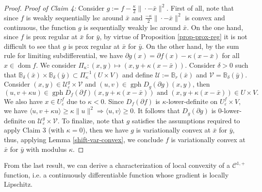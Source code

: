 \documentclass[smallextended,envcountsect,envcountsame]{svjour3}
\newcommand{\gph}{\operatorname{gph}}
\newcommand{\dom}{\operatorname{dom}}
\renewcommand{\epsilon}{\varepsilon}
\newcommand{\1}{\mathds{1}}
\begin{document}
\begin{proof}
		\emph{Proof of Claim 4:} Consider $g := f-\frac{\kappa}{2}\|\cdot - \bar x\|^2$. First of all, note that since $f$ is weakly sequentially lsc around $\bar x$ and $\frac{-\kappa}{2}\|\cdot-\bar x\|^2$ is convex and continuous, the function $g$ is sequentially weakly lsc around $\bar x$. On the one hand, since $f$ is prox regular at $\bar x$ for $\bar y$, by virtue of Proposition \ref{prop-prox-reg} it is not difficult to see that $g$ is prox regular at $\bar x$ for $\bar y$. On the other hand, by the sum rule for limiting subdifferential, we have $\partial g(x) = \partial f(x) -\kappa(x-\bar x)$ for all $x\in \dom f$. We consider $\Pi_\kappa\colon (x,y)\mapsto (x,y+\kappa(x-\bar x))$. Consider $\delta>0$ such that $\mathbb{B}_\delta(\bar x)\times \mathbb{B}_\delta(\bar y)\subset \Pi_\kappa^{-1}(U\times V)$ and define $\mathscr{U} := \mathbb{B}_r(\bar x)$ and $\mathscr{V} = \mathbb{B}_\delta(\bar y)$. Consider $(x,y)\in \mathscr{U}_{\epsilon}^g\times \mathscr{V}$ and $(u,v)\in \gph D_g(\partial g)(x,y)$, then $$(u,v+\kappa u)\in \gph D_f(\partial f)(x,y+\kappa(x-\bar x))\text{ and }(x,y+\kappa(x-\bar x))\in U\times V.$$ We also have $x\in U_\epsilon^f$ due to $\kappa<0$. Since $D_f(\partial f)$ is $\kappa$-lower-definite on $U_\epsilon^f\times V$, we have $\langle u,v+\kappa u\rangle\geq \kappa\|u\|^2\Rightarrow\langle u,v\rangle\geq 0$. It follows that $D_g(\partial g)$ is $0$-lower-definite on $\mathscr{U}_{\epsilon}^g\times \mathscr{V}$. To finalize, note that $g$ satisfies the assumptions required to apply Claim 3 (with $\kappa=0$), then we have $g$ is variationally convex at $\bar x$ for $\bar y$, thus, applying Lemma \ref{shift-var-convex}, we conclude $f$ is variationally convex at $\bar x$ for $\bar y$ with modulus $\kappa$. 
	\end{proof}
	
	From the last result, we can derive a characterization of local convexity of a $\mathcal{C}^{1,+}$ function, i.e. a continuously differentiable function whose gradient is locally Lipschitz.
	
\end{document}
